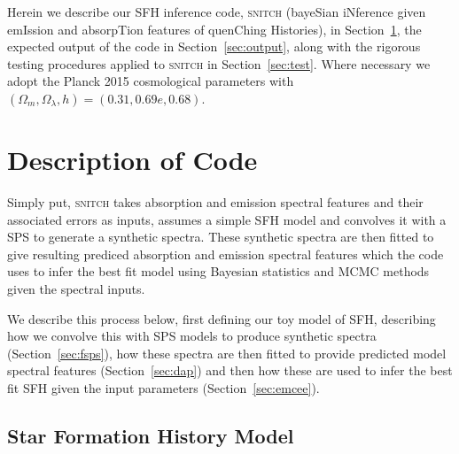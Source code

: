 \documentclass[useAMS,usenatbib]{mn2e}
\begin{document}


Herein we describe our SFH inference code, \textsc{snitch} (bayeSian iNference given emIssion and absorpTion features of quenChing Histories), in Section~\ref{sec:code}, the expected output of the code in Section~\ref{sec:output}, along with the rigorous testing procedures applied to \textsc{snitch} in Section~\ref{sec:test}. Where necessary we adopt the Planck 2015 \citep{planck16} cosmological parameters with $(\Omega_m, \Omega_{\lambda}, h) = (0.31, 0.69e, 0.68)$. 

\section{Description of Code}\label{sec:code}

Simply put, \textsc{snitch} takes absorption and emission spectral features and their associated errors as inputs, assumes a simple SFH model and convolves it with a SPS to generate a synthetic spectra. These synthetic spectra are then fitted to give resulting prediced absorption and emission spectral features which the code uses to infer the best fit model using Bayesian statistics and MCMC methods given the spectral inputs. 

We describe this process below, first defining our toy model of SFH, describing how we convolve this with SPS models to produce synthetic spectra (Section~\ref{sec:fsps}), how these spectra are then fitted to provide predicted model spectral features (Section~\ref{sec:dap}) and then how these are used to infer the best fit SFH given the input parameters (Section~\ref{sec:emcee}). 

\subsection{Star Formation History Model}\label{sec:sfh}
\end{document}
